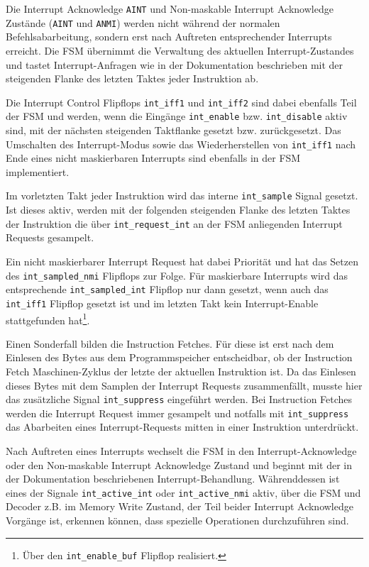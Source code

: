 \documentclass[ngerman, cd=lightcolor]{tudscrreprt}
\begin{document}
Die Interrupt Acknowledge \texttt{AINT} und Non-maskable Interrupt Acknowledge
Zustände (\texttt{AINT} und \texttt{ANMI}) werden nicht während der normalen
Befehlsabarbeitung, sondern erst nach Auftreten entsprechender Interrupts
erreicht. Die FSM übernimmt die Verwaltung des aktuellen Interrupt-Zustandes
und tastet Interrupt-Anfragen wie in der Dokumentation beschrieben mit der
steigenden Flanke des letzten Taktes jeder Instruktion ab.

Die Interrupt Control Flipflops \texttt{int\_iff1} und \texttt{int\_iff2} sind
dabei ebenfalls Teil der FSM und werden, wenn die Eingänge \texttt{int\_enable}
bzw. \texttt{int\_disable} aktiv sind, mit der nächsten steigenden Taktflanke
gesetzt bzw. zurückgesetzt. Das Umschalten des Interrupt-Modus sowie das
Wiederherstellen von \texttt{int\_iff1} nach Ende eines nicht maskierbaren
Interrupts sind ebenfalls in der FSM implementiert.

Im vorletzten Takt jeder Instruktion wird das interne \texttt{int\_sample}
Signal gesetzt. Ist dieses aktiv, werden mit der folgenden steigenden Flanke
des letzten Taktes der Instruktion die über \texttt{int\_request\_int} an der
FSM anliegenden Interrupt Requests gesampelt.

Ein nicht maskierbarer Interrupt Request hat dabei Priorität und hat das Setzen
des \texttt{int\_sampled\_nmi} Flipflops zur Folge. Für maskierbare Interrupts
wird das entsprechende \texttt{int\_sampled\_int} Flipflop nur dann gesetzt,
wenn auch das \texttt{int\_iff1} Flipflop gesetzt ist und im letzten Takt kein
Interrupt-Enable stattgefunden hat\footnote{Über den \texttt{int\_enable\_buf}
Flipflop realisiert.}.

Einen Sonderfall bilden die Instruction Fetches. Für diese ist erst nach dem
Einlesen des Bytes aus dem Programmspeicher entscheidbar, ob der Instruction
Fetch Maschinen-Zyklus der letzte der aktuellen Instruktion ist. Da das
Einlesen dieses Bytes mit dem Samplen der Interrupt Requests zusammenfällt,
musste hier das zusätzliche Signal \texttt{int\_suppress} eingeführt werden.
Bei Instruction Fetches werden die Interrupt Request immer gesampelt und
notfalls mit \texttt{int\_suppress} das Abarbeiten eines Interrupt-Requests
mitten in einer Instruktion unterdrückt.

Nach Auftreten eines Interrupts wechselt die FSM in den Interrupt-Acknowledge
oder den Non-maskable Interrupt Acknowledge Zustand und beginnt mit der in der
Dokumentation beschriebenen Interrupt-Behandlung. Währenddessen ist eines der
Signale \texttt{int\_active\_int} oder \texttt{int\_active\_nmi} aktiv, über
die FSM und Decoder z.B. im Memory Write Zustand, der Teil beider Interrupt
Acknowledge Vorgänge ist, erkennen können, dass spezielle Operationen
durchzuführen sind.
\end{document}
